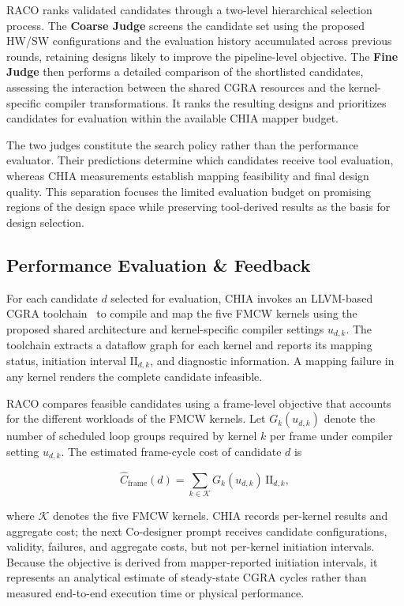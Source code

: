 \documentclass[conference,letterpaper]{IEEEtran}
\begin{document}
RACO ranks validated candidates through a two-level hierarchical selection process. The \textbf{Coarse Judge} screens the candidate set using the proposed HW/SW configurations and the evaluation history accumulated across previous rounds, retaining designs likely to improve the pipeline-level objective. The \textbf{Fine Judge} then performs a detailed comparison of the shortlisted candidates, assessing the interaction between the shared CGRA resources and the kernel-specific compiler transformations. It ranks the resulting designs and prioritizes candidates for evaluation within the available CHIA mapper budget.

The two judges constitute the search policy rather than the performance evaluator. Their predictions determine which candidates receive tool evaluation, whereas CHIA measurements establish mapping feasibility and final design quality. This separation focuses the limited evaluation budget on promising regions of the design space while preserving tool-derived results as the basis for design selection.


\subsection{Performance Evaluation \& Feedback}

For each candidate \(d\) selected for evaluation, CHIA invokes an LLVM-based CGRA toolchain~\cite{tan2021opencgra} to compile and map the five FMCW kernels using the proposed shared architecture and kernel-specific compiler settings \(u_{d,k}\). The toolchain extracts a dataflow graph for each kernel and reports its mapping status, initiation interval \(\mathrm{II}_{d,k}\), and diagnostic information. A mapping failure in any kernel renders the complete candidate infeasible.

RACO compares feasible candidates using a frame-level objective that accounts for the different workloads of the FMCW kernels. Let \(G_k(u_{d,k})\) denote the number of scheduled loop groups required by kernel \(k\) per frame under compiler setting \(u_{d,k}\). The estimated frame-cycle cost of candidate \(d\) is

$$
\widehat{C}_{\mathrm{frame}}(d)
=
\sum_{k \in \mathcal{K}}
G_k(u_{d,k})\,\mathrm{II}_{d,k},
$$

where \(\mathcal{K}\) denotes the five FMCW kernels. CHIA records per-kernel results and aggregate cost; the next Co-designer prompt receives candidate configurations, validity, failures, and aggregate costs, but not per-kernel initiation intervals. Because the objective is derived from mapper-reported initiation intervals, it represents an analytical estimate of steady-state CGRA cycles rather than measured end-to-end execution time or physical performance.
\end{document}

